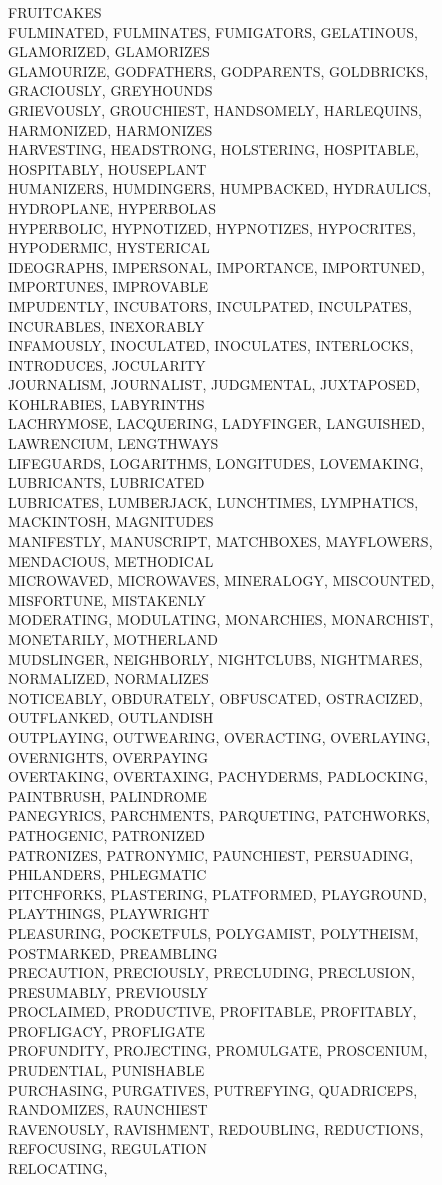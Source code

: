 FRUITCAKES\\FULMINATED, FULMINATES, FUMIGATORS, GELATINOUS, GLAMORIZED, GLAMORIZES\\GLAMOURIZE, GODFATHERS, GODPARENTS, GOLDBRICKS, GRACIOUSLY, GREYHOUNDS\\GRIEVOUSLY, GROUCHIEST, HANDSOMELY, HARLEQUINS, HARMONIZED, HARMONIZES\\HARVESTING, HEADSTRONG, HOLSTERING, HOSPITABLE, HOSPITABLY, HOUSEPLANT\\HUMANIZERS, HUMDINGERS, HUMPBACKED, HYDRAULICS, HYDROPLANE, HYPERBOLAS\\HYPERBOLIC, HYPNOTIZED, HYPNOTIZES, HYPOCRITES, HYPODERMIC, HYSTERICAL\\IDEOGRAPHS, IMPERSONAL, IMPORTANCE, IMPORTUNED, IMPORTUNES, IMPROVABLE\\IMPUDENTLY, INCUBATORS, INCULPATED, INCULPATES, INCURABLES, INEXORABLY\\INFAMOUSLY, INOCULATED, INOCULATES, INTERLOCKS, INTRODUCES, JOCULARITY\\JOURNALISM, JOURNALIST, JUDGMENTAL, JUXTAPOSED, KOHLRABIES, LABYRINTHS\\LACHRYMOSE, LACQUERING, LADYFINGER, LANGUISHED, LAWRENCIUM, LENGTHWAYS\\LIFEGUARDS, LOGARITHMS, LONGITUDES, LOVEMAKING, LUBRICANTS, LUBRICATED\\LUBRICATES, LUMBERJACK, LUNCHTIMES, LYMPHATICS, MACKINTOSH, MAGNITUDES\\MANIFESTLY, MANUSCRIPT, MATCHBOXES, MAYFLOWERS, MENDACIOUS, METHODICAL\\MICROWAVED, MICROWAVES, MINERALOGY, MISCOUNTED, MISFORTUNE, MISTAKENLY\\MODERATING, MODULATING, MONARCHIES, MONARCHIST, MONETARILY, MOTHERLAND\\MUDSLINGER, NEIGHBORLY, NIGHTCLUBS, NIGHTMARES, NORMALIZED, NORMALIZES\\NOTICEABLY, OBDURATELY, OBFUSCATED, OSTRACIZED, OUTFLANKED, OUTLANDISH\\OUTPLAYING, OUTWEARING, OVERACTING, OVERLAYING, OVERNIGHTS, OVERPAYING\\OVERTAKING, OVERTAXING, PACHYDERMS, PADLOCKING, PAINTBRUSH, PALINDROME\\PANEGYRICS, PARCHMENTS, PARQUETING, PATCHWORKS, PATHOGENIC, PATRONIZED\\PATRONIZES, PATRONYMIC, PAUNCHIEST, PERSUADING, PHILANDERS, PHLEGMATIC\\PITCHFORKS, PLASTERING, PLATFORMED, PLAYGROUND, PLAYTHINGS, PLAYWRIGHT\\PLEASURING, POCKETFULS, POLYGAMIST, POLYTHEISM, POSTMARKED, PREAMBLING\\PRECAUTION, PRECIOUSLY, PRECLUDING, PRECLUSION, PRESUMABLY, PREVIOUSLY\\PROCLAIMED, PRODUCTIVE, PROFITABLE, PROFITABLY, PROFLIGACY, PROFLIGATE\\PROFUNDITY, PROJECTING, PROMULGATE, PROSCENIUM, PRUDENTIAL, PUNISHABLE\\PURCHASING, PURGATIVES, PUTREFYING, QUADRICEPS, RANDOMIZES, RAUNCHIEST\\RAVENOUSLY, RAVISHMENT, REDOUBLING, REDUCTIONS, REFOCUSING, REGULATION\\RELOCATING, 